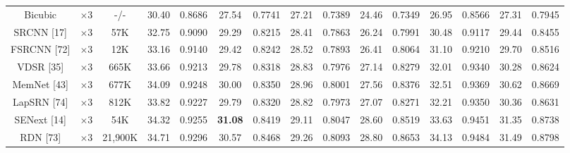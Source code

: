 \documentclass{ieeeaccess}
\begin{document}
\begin{table}
\begin{tabular}{|c|c|c|cc|cc|cc|cc|cc|cc|}
Bicubic&$\times3$ &-/-& \multicolumn{1}{c|}{30.40} & 0.8686  & \multicolumn{1}{c|}{27.54} & 0.7741 & \multicolumn{1}{c|}{27.21} & 0.7389 & \multicolumn{1}{c|}{24.46} & 0.7349  & \multicolumn{1}{c|}{26.95} &0.8566
&\multicolumn{1}{c|}{27.31} & 0.7945\\

SRCNN [17] & $\times3$ & 57K&\multicolumn{1}{c|}{32.75} & 0.9090  & \multicolumn{1}{c|}{29.29} & 0.8215  &\multicolumn{1}{c|}{28.41} & 0.7863  & \multicolumn{1}{c|}{26.24} &0.7991 & \multicolumn{1}{c|}{30.48} &0.9117
&\multicolumn{1}{c|}{29.44} & 0.8455\\

FSRCNN [72]& $\times3$ &12K& \multicolumn{1}{c|}{33.16} &0.9140& \multicolumn{1}{c|}{29.42} & 0.8242 &\multicolumn{1}{c|}{28.52} & 0.7893& \multicolumn{1}{c|}{26.41} &0.8064& \multicolumn{1}{c|}{31.10} &0.9210
&\multicolumn{1}{c|}{29.70} & 0.8516\\

VDSR [35]& $\times3$ &665K& \multicolumn{1}{c|}{33.66} & 0.9213 & \multicolumn{1}{c|}{29.78} & 0.8318 &\multicolumn{1}{c|}{28.83} & 0.7976& \multicolumn{1}{c|}{27.14} & 0.8279 & \multicolumn{1}{c|}{32.01} & 0.9340
&\multicolumn{1}{c|}{30.28} & 0.8624\\

MemNet [43] & $\times3$ &677K& \multicolumn{1}{c|}{34.09} &0.9248  & \multicolumn{1}{c|}{30.00} &0.8350  &\multicolumn{1}{c|}{28.96} & 0.8001 & \multicolumn{1}{c|}{27.56} & 0.8376 & \multicolumn{1}{c|}{32.51} &0.9369
&\multicolumn{1}{c|}{ 30.62} &0.8669\\

LapSRN [74] &$\times3$ &812K& \multicolumn{1}{c|}{33.82} & 0.9227  & \multicolumn{1}{c|}{29.79} & 0.8320  &\multicolumn{1}{c|}{28.82} & 0.7973  & \multicolumn{1}{c|}{27.07} & 0.8271 & \multicolumn{1}{c|}{32.21} & 0.9350
&\multicolumn{1}{c|}{30.36} & 0.8631\\

SENext [14] & $\times3$ &54K& \multicolumn{1}{c|}{34.32} &{0.9255}& \multicolumn{1}{c|}{\color{red}\textbf{31.08}} & {0.8419} & \multicolumn{1}{c|}{29.11} &{0.8047}& \multicolumn{1}{c|}{28.60} &{0.8519}& \multicolumn{1}{c|}{33.63} &{0.9451} &\multicolumn{1}{c|}{31.35} &{0.8738} \\

RDN [73]& $\times3$ &21,900K& \multicolumn{1}{c|}{34.71} &0.9296& \multicolumn{1}{c|}{30.57} & 0.8468 &\multicolumn{1}{c|}{29.26} & 0.8093& \multicolumn{1}{c|}{28.80} &0.8653& \multicolumn{1}{c|}{34.13} &0.9484
&\multicolumn{1}{c|}{31.49} & 0.8798\\


\end{tabular}
\end{table}
\end{document}
